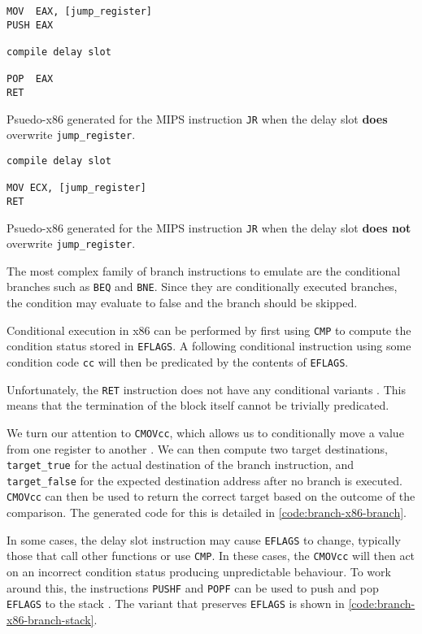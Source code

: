 \begin{lstfloat}[H]
    \begin{lstlisting}
MOV  EAX, [jump_register]
PUSH EAX

compile delay slot

POP  EAX
RET
    \end{lstlisting}
    \caption{Psuedo-x86 generated for the MIPS instruction \texttt{JR} when the delay slot \textbf{does} overwrite \texttt{jump\_register}.}
    \label{code:branch-x86-jr-stack}
\end{lstfloat}

\begin{lstfloat}[H]
    \begin{lstlisting}
compile delay slot

MOV ECX, [jump_register]
RET
    \end{lstlisting}
    \caption{Psuedo-x86 generated for the MIPS instruction \texttt{JR} when the delay slot \textbf{does not} overwrite \texttt{jump\_register}.}
    \label{code:branch-x86-jr}
\end{lstfloat}

The most complex family of branch instructions to emulate are the conditional branches such as \texttt{BEQ} and \texttt{BNE}. Since they are conditionally executed branches, the condition may evaluate to false and the branch should be skipped.

Conditional execution in x86 can be performed by first using \texttt{CMP} \cite{x86-cmp} to compute the condition status stored in \texttt{EFLAGS}. A following conditional instruction using some condition code \texttt{cc} will then be predicated by the contents of \texttt{EFLAGS}.

Unfortunately, the \texttt{RET} instruction does not have any conditional variants \cite{x86-ret}. This means that the termination of the block itself cannot be trivially predicated.

We turn our attention to \texttt{CMOVcc}, which allows us to conditionally move a value from one register to another \cite{x86-cmovcc}. We can then compute two target destinations, \texttt{target\_true} for the actual destination of the branch instruction, and \texttt{target\_false} for the expected destination address after no branch is executed. \texttt{CMOVcc} can then be used to return the correct target based on the outcome of the comparison. The generated code for this is detailed in \autoref{code:branch-x86-branch}.

In some cases, the delay slot instruction may cause \texttt{EFLAGS} to change, typically those that call other functions or use \texttt{CMP}. In these cases, the \texttt{CMOVcc} will then act on an incorrect condition status producing unpredictable behaviour. To work around this, the instructions \texttt{PUSHF} and \texttt{POPF} can be used to push and pop \texttt{EFLAGS} to the stack \cite{x86-pushf, x86-popf}. The variant that preserves \texttt{EFLAGS} is shown in \autoref{code:branch-x86-branch-stack}.


